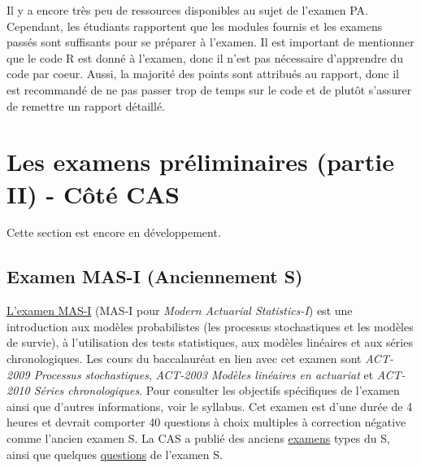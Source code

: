Il y a encore très peu de ressources disponibles au sujet de l'examen PA. Cependant, les étudiants rapportent que les modules fournis et les examens passés sont suffisants pour se préparer à l'examen. Il est important de mentionner que le code R est donné à l'examen, donc il n'est pas nécessaire d'apprendre du code par coeur. Aussi, la majorité des points sont attribués au rapport, donc il est recommandé de ne pas passer trop de temps sur le code et de plutôt s'assurer de remettre un rapport détaillé. \vspace{\baselineskip}

\newpage

\section*{Les examens préliminaires (partie II) - Côté CAS}
\label{sec:prelimssuitecas}

Cette section est encore en développement. \vspace{\baselineskip}


\subsection*{Examen MAS-I (Anciennement S)}
\label{subsec:examMAS_I}

\href{http://www.casact.org/admissions/syllabus/index.cfm?fa=MASI&parentID=391}{L'examen MAS-I} (MAS-I pour \textit{Modern Actuarial Statistics-I}) est une introduction aux modèles probabilistes (les processus stochastiques et les modèles de survie), à l'utilisation des tests statistiques, aux modèles linéaires et aux séries chronologiques. Les cours du baccalauréat en lien avec cet examen sont \textit{ACT-2009 Processus stochastiques}, \textit{ACT-2003 Modèles linéaires en actuariat} et \textit{ACT-2010 Séries chronologiques}. Pour consulter les objectifs spécifiques de l'examen ainsi que d'autres informations, voir le syllabus. Cet examen est d'une durée de 4 heures et devrait comporter 40 questions à choix multiples à correction négative comme l'ancien examen S. La CAS a publié des anciens \href{http://www.casact.org/admissions/studytools/examS/}{examens} types du S, ainsi que quelques \href{http://www.casact.org/admissions/studytools/examS/Sample_Questions.pdf}{questions} de l'examen S.\vspace{\baselineskip}


